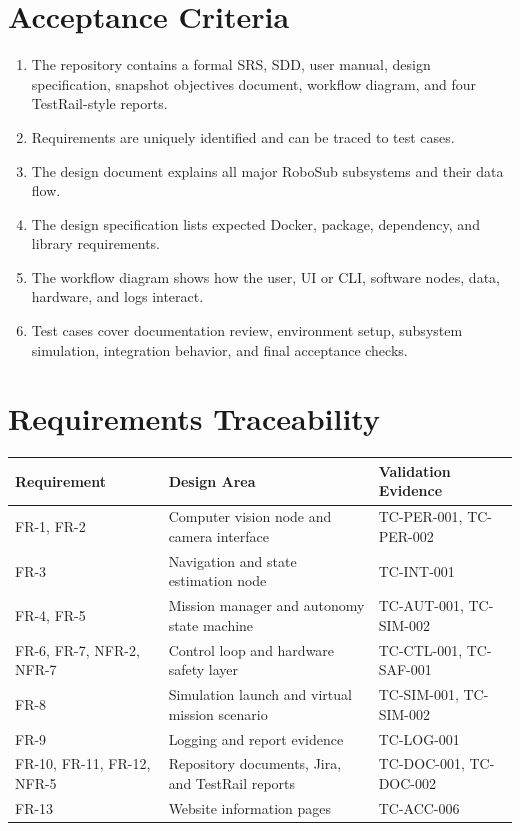 \documentclass[12pt]{article}
\begin{document}
\section{Acceptance Criteria}
\begin{enumerate}[leftmargin=*]
  \item The repository contains a formal SRS, SDD, user manual, design specification, snapshot objectives document, workflow diagram, and four TestRail-style reports.
  \item Requirements are uniquely identified and can be traced to test cases.
  \item The design document explains all major RoboSub subsystems and their data flow.
  \item The design specification lists expected Docker, package, dependency, and library requirements.
  \item The workflow diagram shows how the user, UI or CLI, software nodes, data, hardware, and logs interact.
  \item Test cases cover documentation review, environment setup, subsystem simulation, integration behavior, and final acceptance checks.
\end{enumerate}

\section{Requirements Traceability}
\begin{longtable}{|p{}|p{}|p{}|}
\hline
\textbf{Requirement} & \textbf{Design Area} & \textbf{Validation Evidence} \\
\hline
FR-1, FR-2 & Computer vision node and camera interface & TC-PER-001, TC-PER-002 \\
\hline
FR-3 & Navigation and state estimation node & TC-INT-001 \\
\hline
FR-4, FR-5 & Mission manager and autonomy state machine & TC-AUT-001, TC-SIM-002 \\
\hline
FR-6, FR-7, NFR-2, NFR-7 & Control loop and hardware safety layer & TC-CTL-001, TC-SAF-001 \\
\hline
FR-8 & Simulation launch and virtual mission scenario & TC-SIM-001, TC-SIM-002 \\
\hline
FR-9 & Logging and report evidence & TC-LOG-001 \\
\hline
FR-10, FR-11, FR-12, NFR-5 & Repository documents, Jira, and TestRail reports & TC-DOC-001, TC-DOC-002 \\
\hline
FR-13 & Website information pages & TC-ACC-006 \\
\hline
\end{longtable}
\end{document}
